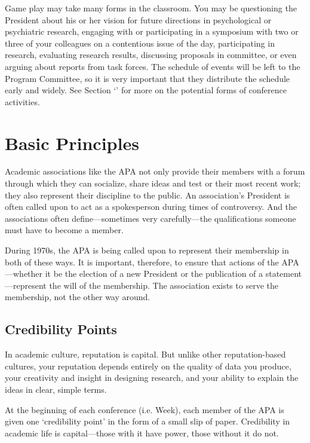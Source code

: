 \begin{refsection}
 

Game play may take many forms in the classroom. You may be questioning the President about his or her vision for future directions in psychological or psychiatric research, engaging with or participating in a symposium with two or three of your colleagues on a contentious issue of the day, participating in research, evaluating research results, discussing proposals in committee, or even arguing about reports from task forces. The schedule of events will be left to the Program Committee, so it is very important that they distribute the schedule early and widely. See Section ‘’ for more on the potential forms of conference activities.

\section{Basic Principles}
\label{basicprinciples}

Academic associations like the APA not only provide their members with a forum through which they can socialize, share ideas and test or their most recent work; they also represent their discipline to the public. An association's President is often called upon to act as a spokesperson during times of controversy. And the associations often define---sometimes very carefully---the qualifications someone must have to become a member.

During 1970s, the APA is being called upon to represent their membership in both of these ways. It is important, therefore, to ensure that actions of the APA---whether it be the election of a new President or the publication of a statement---represent the will of the membership. The association exists to serve the membership, not the other way around.

\subsection{Credibility Points}
\label{credibilitypoints}

In academic culture, reputation is capital. But unlike other reputation-based cultures, your reputation depends entirely on the quality of data you produce, your creativity and insight in designing research, and your ability to explain the ideas in clear, simple terms. 

At the beginning of each conference (i.e. Week), each member of the APA is given one ‘credibility point' in the form of a small slip of paper. Credibility in academic life is capital---those with it have power, those without it do not.


\end{refsection}
